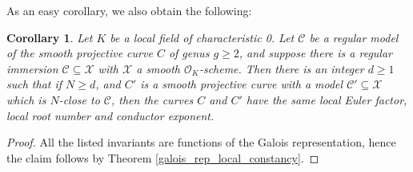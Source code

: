 \documentclass{article}
\theoremstyle{definition}
\theoremstyle{plain}
\newtheorem{cor}[defn]{Corollary}
\theoremstyle{remark}
\begin{document}
	As an easy corollary, we also obtain the following:
	\begin{cor}\label{galois_rep_invariants_local_constancy} 
		Let $K$ be a local field of characteristic 0. Let $\mathcal{C}$ be a regular model of the smooth projective curve $C$ of genus $g\ge 2$, and suppose there is a regular immersion $\mathcal{C}\subseteq \mathcal{X}$ with $\mathcal{X}$ a smooth $\mathcal{O}_K$-scheme. Then there is an integer $d\ge 1$ such that if $N\ge d$, and $C'$ is a smooth projective curve with a model $\mathcal{C}'\subseteq \mathcal{X}$ which is $N$-close to $\mathcal{C}$, then the curves $C$ and $C'$ have the same local Euler factor, local root number and conductor exponent.
	\end{cor}
	\begin{proof}
		All the listed invariants are functions of the Galois representation, hence the claim follows by Theorem \ref{galois_rep_local_constancy}.
	\end{proof}
	\appendix
\end{document}
